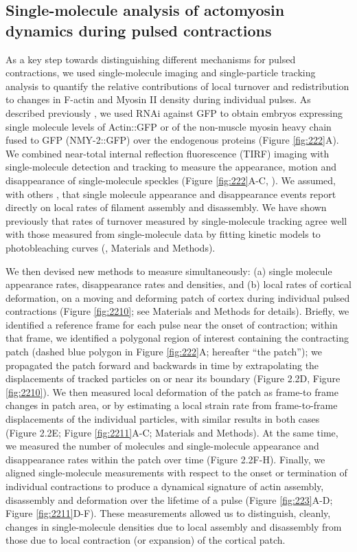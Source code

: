 \subsection{Single-molecule analysis of actomyosin dynamics during pulsed contractions}
As a key step towards distinguishing different mechanisms for pulsed contractions, we used single-molecule imaging and single-particle tracking analysis to quantify the relative contributions of local turnover and redistribution to changes in F-actin and Myosin II density during individual pulses. As described previously \cite{Robin:2014jf}, we used RNAi against GFP to obtain embryos expressing single molecule levels of Actin::GFP or of the non-muscle myosin heavy chain fused to GFP (NMY-2::GFP) over the endogenous proteins (Figure \ref{fig:222}A). We combined near-total internal reflection fluorescence (TIRF) imaging with single-molecule detection and tracking to measure the appearance, motion and disappearance of single-molecule speckles (Figure \ref{fig:222}A-C, \cite{Robin:2014jf}). We assumed, with others \cite{Watanabe:2002jb, Vallotton:2004kz}, that single molecule appearance and disappearance events report directly on local rates of filament assembly and disassembly.  We have shown previously that rates of turnover measured by single-molecule tracking agree well with those measured from single-molecule data by fitting kinetic models to photobleaching curves  (\cite{Robin:2014jf}, Materials and Methods).

We then devised new methods to measure simultaneously: (a) single molecule appearance rates, disappearance rates and densities, and (b) local rates of cortical deformation, on a moving and deforming patch of cortex during individual pulsed contractions (Figure \ref{fig:2210}; see Materials and Methods for details). Briefly, we identified a reference frame for each pulse near the onset of contraction; within that frame, we identified a polygonal region of interest containing the contracting patch (dashed blue polygon in Figure \ref{fig:222}A; hereafter “the patch”); we propagated the patch forward and backwards in time by extrapolating the displacements of tracked particles on or near its boundary (Figure 2.2D, Figure \ref{fig:2210}).   We then measured local deformation of the patch as frame-to frame changes in patch area, or by estimating a local strain rate from frame-to-frame displacements of the individual particles, with similar results in both cases (Figure 2.2E; Figure \ref{fig:2211}A-C; Materials and Methods).  At the same time, we measured the number of molecules and single-molecule appearance and disappearance rates within the patch over time (Figure 2.2F-H). Finally, we aligned single-molecule measurements with respect to the onset or termination of individual contractions to produce a dynamical signature of actin assembly, disassembly and deformation over the lifetime of a pulse (Figure \ref{fig:223}A-D; Figure \ref{fig:2211}D-F). These measurements allowed us to distinguish, cleanly, changes in single-molecule densities due to local assembly and disassembly from those due to local contraction (or expansion) of the cortical patch.


